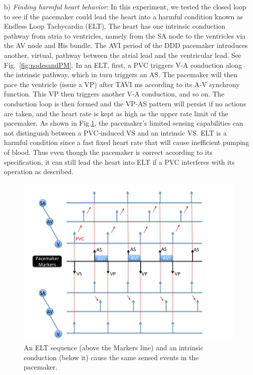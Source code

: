 b) \emph{Finding harmful heart behavior}: In this experiment, we tested the closed loop to see if the pacemaker could lead the heart into a harmful condition known as Endless Loop Tachycardia (ELT).
%
The heart has one intrinsic conduction pathway from atria to ventricles, namely from the SA node to the ventricles via the AV node and His bundle.
The AVI period of the DDD pacemaker introduces another, virtual, pathway between the atrial lead and the ventricular lead.
See Fig.~\ref{fig:nodesandPM}.
In an ELT, first, a PVC triggers V-A conduction along the intrinsic pathway, 
which in turn triggers an AS. 
The pacemaker will then pace the ventricle (issue a VP) after TAVI ms according to its A-V synchrony function. 
This VP then triggers another V-A conduction, and so on.
The conduction loop is then formed and the VP-AS pattern will persist if no actions are taken,
and the heart rate is kept as high as the upper rate limit of the pacemaker.%
As shown in Fig.\ref{fig:ambiguity}, the pacemaker's limited sensing capabilities can not distinguish between a PVC-induced VS and an intrinsic VS.
ELT is a harmful condition since a fast fixed heart rate that will cause inefficient pumping of blood.
Thus even though the pacemaker is correct according to its specification, it can still lead the heart into ELT if a PVC interferes with its operation as described.
%
\begin{figure}[t]
\centering
\includegraphics[scale=0.3]{figures/ambiguity}
\caption{An ELT sequence (above the Markers line) and an intrinsic conduction (below it) cause the same sensed events in the pacemaker.}
\label{fig:ambiguity}
\vspace{-0.7cm}
\end{figure}
